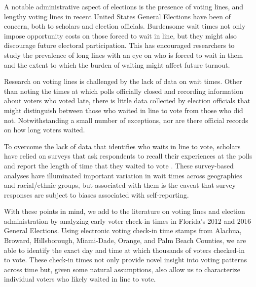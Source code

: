\documentclass[12pt,titlepage]{article}
\begin{document}
A notable administrative aspect of elections is the presence of voting
lines, and lengthy voting lines in recent United States General
Elections have been of concern, both to scholars and election
officials.  Burdensome wait times not only impose opportunity costs on
those forced to wait in line, but they might also discourage future
electoral participation.  This has encouraged researchers to study the
prevalence of long lines with an eye on who is forced to wait in them
and the extent to which the burden of waiting might affect future
turnout.

Research on voting lines is challenged by the lack of data on wait
times.  Other than noting the times at which polls officially closed
and recording information about voters who voted late, there is little
data collected by election officials that might distinguish between
those who waited in line to vote from those who did not.
Notwithstanding a small number of exceptions, nor are there official
records on how long voters waited.  


To overcome the lack of data that identifies who waits in line to
vote, scholars have relied on surveys that ask respondents to recall
their experiences at the polls and report the length of time that they
waited to vote \citep{stewart:waitingtovote2012,
  pettigrew:racegapwaittimes}.  These survey-based analyses have
illuminated important variation in wait times across geographies and
racial/ethnic groups, but associated with them is the caveat that
survey responses are subject to biases associated with self-reporting.

With these points in mind, we add to the literature on voting lines
and election administration by analyzing early voter check-in times in
Florida's 2012 and 2016 General Elections. Using electronic voting
check-in time stamps from Alachua, Broward, Hillsborough, Miami-Dade,
Orange, and Palm Beach Counties, we are able to identify the exact day
and time at which thousands of voters checked-in to vote.  These
check-in times not only provide novel insight into voting patterns
across time but, given some natural assumptions, also allow us to
characterize individual voters who likely waited in line to vote.
\end{document}

